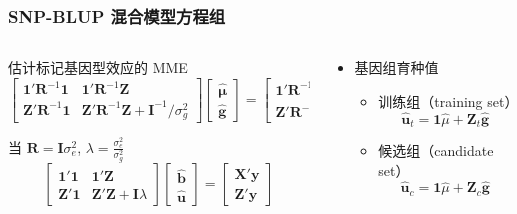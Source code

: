 \documentclass[serif,aspectratio=169]{beamer}
\begin{document}
\begin{frame}
  \frametitle{SNP-BLUP 混合模型方程组}
  \begin{columns}
    \begin{column}{.6\textwidth}
      \begin{block}{估计标记基因型效应的 MME}
        $$
        \left[\begin{array}{ll}
            \mathbf{1}'\mathbf{R}^{-1}\mathbf{1} & \mathbf{1}'\mathbf{R}^{-1}\mathbf{Z}\\
            \mathbf{Z}'\mathbf{R}^{-1}\mathbf{1} & \mathbf{Z}'\mathbf{R}^{-1}\mathbf{Z}+\mathbf{I}^{-1}/\sigma_g^2
          \end{array}\right]
        \left[\begin{array}{cc}
            \hat{\mathbf{\mu}}\\
            \hat{\mathbf{g}}
          \end{array}\right] = 
        \left[\begin{array}{c}
            \mathbf{1}'\mathbf{R}^{-1}\mathbf{y}\\
            \mathbf{Z}'\mathbf{R}^{-1}\mathbf{y}
          \end{array}\right]
        $$
      \end{block}

      \begin{block}{当 $\mathbf{R=I}\sigma_e^2$, $\lambda=\frac{\sigma_e^2}{\sigma_g^2}$}
        $$
        \left[\begin{array}{ll}
            \mathbf{1}'\mathbf{1} & \mathbf{1}'\mathbf{Z}\\
            \mathbf{Z}'\mathbf{1} & \mathbf{Z}'\mathbf{Z}+\mathbf{I}\lambda
          \end{array}\right]
        \left[\begin{array}{cc}
            \hat{\mathbf{b}}\\
            \hat{\mathbf{u}}
          \end{array}\right] = 
        \left[\begin{array}{c}
            \mathbf{X}'\mathbf{y}\\
            \mathbf{Z}'\mathbf{y}
          \end{array}\right]
        $$
      \end{block}
    \end{column}

    \pause
    \begin{column}{.4\textwidth}
      \begin{itemize}
      \item 基因组育种值
        \begin{itemize}
        \item 训练组（training set）
          $$\hat{\mathbf{u}}_t = \mathbf{1}\hat{\mu}+\mathbf{Z}_t\hat{\mathbf{g}}$$
        \item 候选组（candidate set）
          $$\hat{\mathbf{u}}_c = \mathbf{1}\hat{\mu}+\mathbf{Z}_c\hat{\mathbf{g}}$$
        \end{itemize}
      \end{itemize}
    \end{column}
  \end{columns}
\end{frame}
\end{document}
